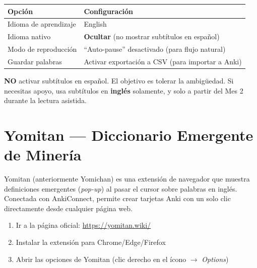 \documentclass[12pt,a4paper]{article}
\begin{document}
\begin{cajapaso}
\begin{tabularx}{\textwidth}{@{} l X @{}}
\toprule
\textbf{Opción} & \textbf{Configuración} \\
\midrule
Idioma de aprendizaje & English \\
Idioma nativo & \textbf{Ocultar} (no mostrar subtítulos en español) \\
Modo de reproducción & ``Auto-pause'' desactivado (para flujo natural) \\
Guardar palabras & Activar exportación a CSV (para importar a Anki) \\
\bottomrule
\end{tabularx}
\end{cajapaso}

\begin{cajaalerta}
\textbf{NO} activar subtítulos en español. El objetivo es tolerar la ambigüedad. Si necesitas apoyo, usa subtítulos en \textbf{inglés} solamente, y solo a partir del Mes 2 durante la lectura asistida.
\end{cajaalerta}

\section{Yomitan — Diccionario Emergente de Minería}

\begin{cajaherramienta}
Yomitan (anteriormente Yomichan) es una extensión de navegador que muestra definiciones emergentes (\textit{pop-up}) al pasar el cursor sobre palabras en inglés. Conectada con AnkiConnect, permite crear tarjetas Anki con un solo clic directamente desde cualquier página web.
\end{cajaherramienta}

\begin{cajapaso}
\begin{enumerate}[leftmargin=1.2cm]
  \item Ir a la página oficial: \url{https://yomitan.wiki/}
  \item Instalar la extensión para Chrome/Edge/Firefox
  \item Abrir las opciones de Yomitan (clic derecho en el ícono $\rightarrow$ \textit{Options})
\end{enumerate}
\end{cajapaso}
\end{document}

